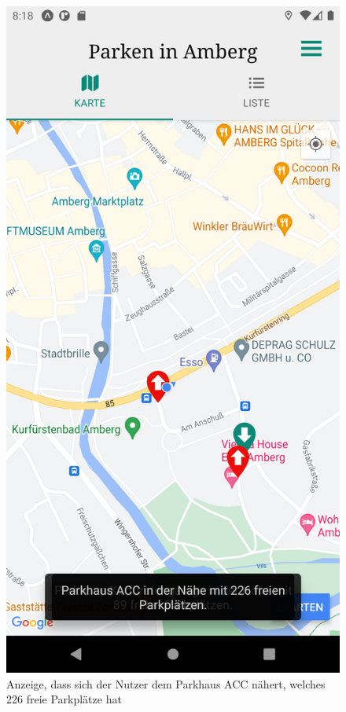 \begin{figure}
	\vspace{-\baselineskip}
	\centering
	\includegraphics[scale=0.15]{img/Geofencing}
	\caption{Anzeige, dass sich der Nutzer dem Parkhaus ACC nähert, welches 226 freie Parkplätze hat}
	\label{fig:Geofencing}
\end{figure}
